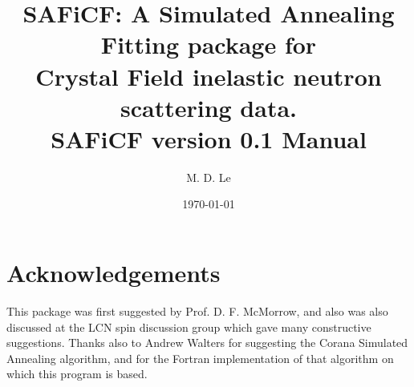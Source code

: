 \documentclass[12pt,onecolumn,tightenlines,aps,amsmath,floatfix,notitlepage,nofootinbib]{revtex4}
\begin{document}
\title{SAFiCF: A Simulated Annealing Fitting package for \\ Crystal Field inelastic neutron scattering data. \\ SAFiCF version 0.1 Manual}

\author{M. D. Le}

{}

\date{\today}






\maketitle

\tableofcontents                %

\section{Acknowledgements} \label{sec-acknowledgements}

This package was first suggested by Prof. D. F. McMorrow, and also was also discussed at the LCN spin discussion group which gave many constructive suggestions. Thanks also to Andrew Walters for suggesting the Corana Simulated Annealing algorithm, and for the Fortran implementation of that algorithm on which this program is based. 

\newpage
\end{document}
